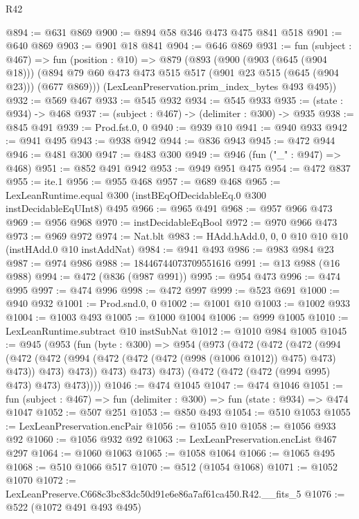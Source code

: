 \begin{lexlean}{R42}
\begin{coremodule}
@894 := @631 @869
@900 := @894 @58 @346 @473 @475 @841 @518
@901 := @640 @869
@903 := @901 @18 @841
@904 := @646 @869
@931 := fun (subject : @467) =>
  fun (position : @10) =>
  @879
    (@893
      (@900
        (@903 (@645 (@904 @18)))
        (@894 @79 @60 @473 @473 @515 @517 (@901 @23 @515 (@645 (@904 @23))) (@677 @869)))
      (LexLeanPreservation.prim_index_bytes @493 @495))
@932 := @569 @467
@933 := @545 @932
@934 := @545 @933
@935 := (state : @934) -> @468
@937 := (subject : @467) -> (delimiter : @300) -> @935
@938 := @845 @491
@939 := Prod.fst.{0, 0}
@940 := @939 @10
@941 := @940 @933
@942 := @941 @495
@943 := @938 @942
@944 := @836 @943
@945 := @472 @944
@946 := @481 @300
@947 := @483 @300
@949 := @946 (fun ("_" : @947) => @468)
@951 := @852 @491 @942
@953 := @949 @951 @475
@954 := @472 @837
@955 := ite.{1}
@956 := @955 @468
@957 := @689 @468
@965 := LexLeanRuntime.equal @300 (instBEqOfDecidableEq.{0} @300 instDecidableEqUInt8) @495
@966 := @965 @491
@968 := @957 @966 @473
@969 := @956 @968
@970 := instDecidableEqBool
@972 := @970 @966 @473
@973 := @969 @972
@974 := Nat.blt
@983 := HAdd.hAdd.{0, 0, 0} @10 @10 @10 (instHAdd.{0} @10 instAddNat)
@984 := @941 @493
@986 := @983 @984 @23
@987 := @974 @986
@988 := 18446744073709551616
@991 := @13 @988 (@16 @988)
@994 := @472 (@836 (@987 @991))
@995 := @954 @473
@996 := @474 @995
@997 := @474 @996
@998 := @472 @997
@999 := @523 @691
@1000 := @940 @932
@1001 := Prod.snd.{0, 0}
@1002 := @1001 @10
@1003 := @1002 @933
@1004 := @1003 @493
@1005 := @1000 @1004
@1006 := @999 @1005
@1010 := LexLeanRuntime.subtract @10 instSubNat
@1012 := @1010 @984 @1005
@1045 := @945
    (@953
      (fun (byte : @300) =>
      @954
        (@973
          (@472
            (@472
              (@472
                (@994
                  (@472
                    (@472 (@994 (@472 (@472 (@472 (@998 (@1006 @1012)) @475) @473) @473)) @473)
                    @473))
                @473)
              @473)
            @473)
          (@472 (@472 (@472 (@994 @995) @473) @473) @473))))
@1046 := @474 @1045
@1047 := @474 @1046
@1051 := fun (subject : @467) => fun (delimiter : @300) => fun (state : @934) => @474 @1047
@1052 := @507 @251
@1053 := @850 @493
@1054 := @510 @1053
@1055 := LexLeanPreservation.encPair
@1056 := @1055 @10
@1058 := @1056 @933 @92
@1060 := @1056 @932 @92
@1063 := LexLeanPreservation.encList @467 @297
@1064 := @1060 @1063
@1065 := @1058 @1064
@1066 := @1065 @495
@1068 := @510 @1066 @517
@1070 := @512 (@1054 @1068)
@1071 := @1052 @1070
@1072 := LexLeanPreserve.C668c3bc83dc50d91e6e86a7af61ca450.R42.__fits_5
@1076 := @522 (@1072 @491 @493 @495)

\end{coremodule}
\end{lexlean}
